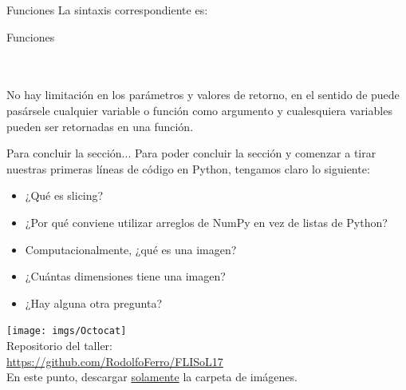 \documentclass[usenames,dvipsnames]{beamer}
\begin{document}
  \begin{frame}{Funciones}
    La sintaxis correspondiente es:
    \begin{block}{Funciones}
      \\
      \\
      \\
      \vspace*{0.5cm}
    \end{block}
    \vspace*{0.5cm}

    No hay limitación en los parámetros y valores de retorno, en el sentido de
    puede pasársele cualquier variable o función como argumento y cualesquiera
    variables pueden ser retornadas en una función.
  \end{frame}

  \begin{frame}{Para concluir la sección...}
    Para poder concluir la sección y comenzar a tirar nuestras primeras
    líneas de código en Python, tengamos claro lo siguiente:
    \begin{itemize}
      \item ¿Qué es slicing?
      \item ¿Por qué conviene utilizar arreglos de NumPy en vez de listas
      de Python?
      \item Computacionalmente, ¿qué es una imagen?
      \item ¿Cuántas dimensiones tiene una imagen?
      \item ¿Hay alguna otra pregunta?
    \end{itemize}
  \end{frame}

  \begin{frame}[standout]
    \texttt{[image: imgs/Octocat]}\\
    Repositorio del taller:\\
    {\color{orange} \url{https://github.com/RodolfoFerro/FLISoL17}}\\
    \vspace*{0.5cm}
    En este punto, descargar \underline{solamente} la carpeta de imágenes.
  \end{frame}
\end{document}
